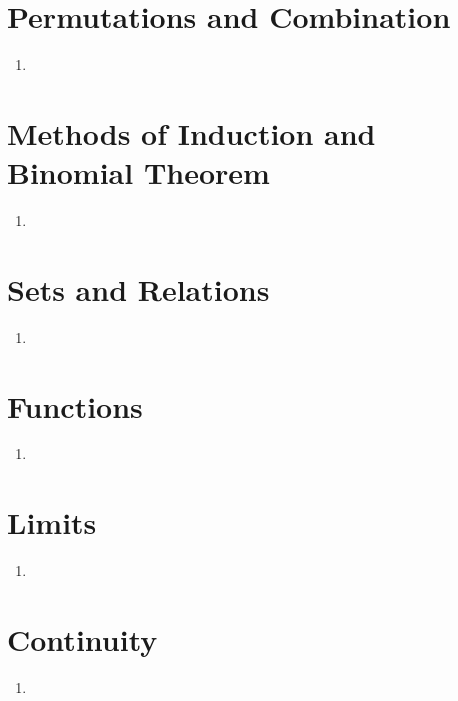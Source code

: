 \documentclass[17pt]{extarticle}
\begin{document}
\begin{multicols}{2}
\begin{enumerate}
\end{enumerate} 

\section{Permutations and Combination}
\noindent
\begin{enumerate}
\item 

\end{enumerate} 


\section{Methods of Induction and Binomial Theorem}
\noindent
\begin{enumerate}
\item

\end{enumerate} 

\section{Sets and Relations}
\noindent
\begin{enumerate}
\item 

\end{enumerate} 

\section{Functions}
\noindent
\begin{enumerate}
\item

\end{enumerate} 

\section{Limits}
\noindent
\begin{enumerate}
\item 

\end{enumerate} 

\section{Continuity}
\noindent
\begin{enumerate}
\item


\end{enumerate}
\end{multicols}
\end{document}
